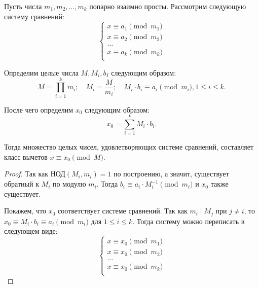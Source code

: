 \documentclass[a4paper]{article}
\theoremstyle{named}
\renewcommand{\gcd}{\text{НОД}}
\begin{document}
\begin{colloq}
        \begin{theorem*}
            Пусть числа $m_1, m_2, \dots, m_k$ попарно взаимно просты. Рассмотрим следующую систему сравнений:
            \begin{equation*}
                \begin{cases}
                    x \equiv a_1 \pmod{m_1} \\
                    x \equiv a_2 \pmod{m_2} \\
                    \dots \\
                    x \equiv a_k \pmod{m_k} \\
                \end{cases}
            \end{equation*}

            Определим целые числа $M, M_i, b_I$ следующим образом:
            \begin{equation*}
                M = \prod_{i = 1}^k m_i; \quad
                M_i = \dfrac{M}{m_i}; \quad
                M_i \cdot b_i \equiv a_i \pmod{m_i}, 1 \leq i \leq k.
            \end{equation*}

            После чего определим $x_0$ следующим образом:
            \begin{equation*}
                x_0 = \sum_{i = 1}^k M_i \cdot b_i.
            \end{equation*}

            Тогда множество целых чисел, удовлетворяющих системе сравнений, составляет класс вычетов $x \equiv x_0 \pmod M$.
        \end{theorem*}

        \begin{proof}
            Так как $\gcd(M_i, m_i) = 1$ по построению, а значит, существует обратный к $M_i$ по модулю $m_i$. Тогда $b_i \equiv a_i \cdot M_i^{-1} \pmod{m_i}$ и $x_0$ также существует.

            Покажем, что $x_0$ соответствует системе сравнений. Так как $m_i \mid M_j$ при $j \neq i$, то $x_0 \equiv M_i \cdot b_i \equiv a_i \pmod{m_i}$ для $1 \leq i \leq k$. Тогда систему можно переписать в следующем виде:
            \begin{equation*}
                 \begin{cases}
                    x \equiv x_0 \pmod{m_1} \\
                    x \equiv x_0 \pmod{m_2} \\
                    \dots \\
                    x \equiv x_0 \pmod{m_k} \\
                \end{cases}
            \end{equation*}


\end{proof}
\end{colloq}
\end{document}
